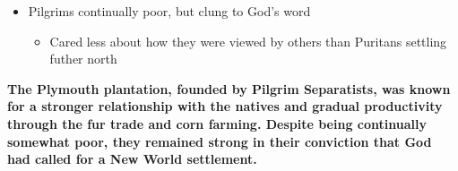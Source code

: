 \documentclass[a4paper]{article}
\begin{document}
{\begin{itemize}
        \begin{itemize}
            \item Ended harsh regime, communal labor plan of Standish
            \item Distributed land among families, eventually able to pay off financiers with wealth from fur trade
        \end{itemize}
        \item Pilgrims continually poor, but clung to God's word
        \begin{itemize}
            \item Cared less about how they were viewed by others than Puritans settling futher north
        \end{itemize}
    \end{itemize}
    \textbf{The Plymouth plantation, founded by Pilgrim Separatists, was known for a stronger relationship with the natives and gradual productivity through the fur trade and corn farming. Despite being continually somewhat poor, they remained strong in their conviction that God had called for a New World settlement.}}
\end{document}
